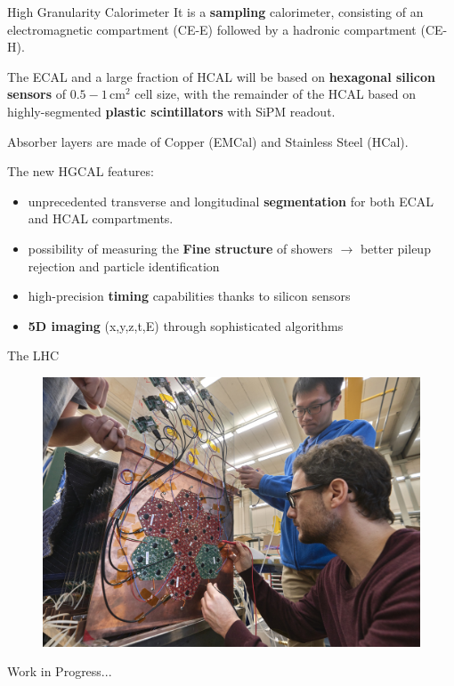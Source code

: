 \documentclass[10pt]{beamer}
\begin{document}
\begin{frame}{High Granularity Calorimeter}
    It is a \textbf{sampling} calorimeter, consisting of an electromagnetic compartment (CE-E) followed by a hadronic compartment (CE-H).
    
    The ECAL and a large fraction of HCAL will be based on \textbf{hexagonal silicon sensors} of $0.5 - 1\,\text{cm}^2$ cell size, with the remainder of the HCAL based on highly-segmented \textbf{plastic scintillators} with SiPM readout.
    
    Absorber layers are made of Copper (EMCal) and Stainless Steel (HCal).

    The new HGCAL features:
    \begin{itemize}
        \item unprecedented transverse and longitudinal \textbf{segmentation} for both ECAL and HCAL compartments. 
        \item possibility of measuring the \textbf{Fine structure} of showers $\rightarrow$ better pileup rejection and particle identification
        \item high-precision \textbf{timing} capabilities thanks to silicon sensors
        \item \textbf{5D imaging} (x,y,z,t,E) through sophisticated algorithms 
    \end{itemize}{}
\end{frame}

\begin{frame}[fragile]{The LHC}
    \begin{figure}
        \centering
        \includegraphics[width=.85\textwidth]{./img/upgrade/hex_mod_dev.jpg}
    \end{figure}
    
    \begin{center}
    Work in Progress...     
    \end{center}
\end{frame}
\end{document}
